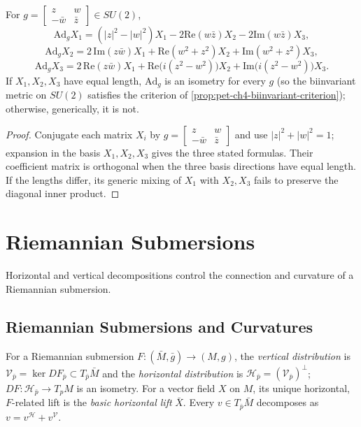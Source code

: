 \begin{proposition}
  \label{prop:pet-ch4-berger-adjoint-action}
  For $g=\left[\begin{smallmatrix}z&w\\-\bar w&\bar z\end{smallmatrix}\right]\in SU(2)$,
  \[
    \mathrm{Ad}_gX_1=(|z|^2-|w|^2)X_1-2\mathrm{Re}(w\bar z)X_2-2\mathrm{Im}(w\bar z)X_3,
  \]
  \[
    \mathrm{Ad}_gX_2=2\,\mathrm{Im}(z\bar w)X_1+\mathrm{Re}(w^2+z^2)X_2+\mathrm{Im}(w^2+z^2)X_3,
  \]
  \[
    \mathrm{Ad}_gX_3=2\,\mathrm{Re}(z\bar w)X_1+\mathrm{Re}\big(i(z^2-w^2)\big)X_2+\mathrm{Im}\big(i(z^2-w^2)\big)X_3.
  \]
  If $X_1,X_2,X_3$ have equal length, $\mathrm{Ad}_g$ is an isometry for every
  $g$ (so the biinvariant metric on $SU(2)$ satisfies the criterion of
  \cref{prop:pet-ch4-biinvariant-criterion}); otherwise, generically, it is
  not.
\end{proposition}
\begin{proof}
  \sketch
  Conjugate each matrix $X_i$ by
  $g=\left[\begin{smallmatrix}z&w\\-\bar w&\bar z\end{smallmatrix}\right]$ and use
  $|z|^2+|w|^2=1$; expansion in the basis $X_1,X_2,X_3$ gives the three stated
  formulas. Their coefficient matrix is orthogonal when the three basis
  directions have equal length. If the lengths differ, its generic mixing of
  $X_1$ with $X_2,X_3$ fails to preserve the diagonal inner product.
\end{proof}

\section{Riemannian Submersions}

Horizontal and vertical decompositions control the connection and curvature of a
Riemannian submersion.

\subsection{Riemannian Submersions and Curvatures}

\begin{definition}
  \label{def:pet-ch4-vertical-horizontal-distribution}
  For a Riemannian submersion $F:(\bar M,\bar g)\to(M,g)$, the \emph{vertical
  distribution} is $\mathcal V_{\bar p}=\ker DF_{\bar p}\subset T_{\bar p}\bar M$
  and the \emph{horizontal distribution} is $\mathcal H_{\bar p}=(\mathcal V_{\bar p})^\perp$;
  $DF:\mathcal H_{\bar p}\to T_pM$ is an isometry. For a vector field $X$ on
  $M$, its unique horizontal, $F$-related lift is the \emph{basic horizontal
  lift} $\bar X$. Every $v\in T_{\bar p}\bar M$ decomposes as $v=v^{\mathcal H}+v^{\mathcal V}$.
\end{definition}

